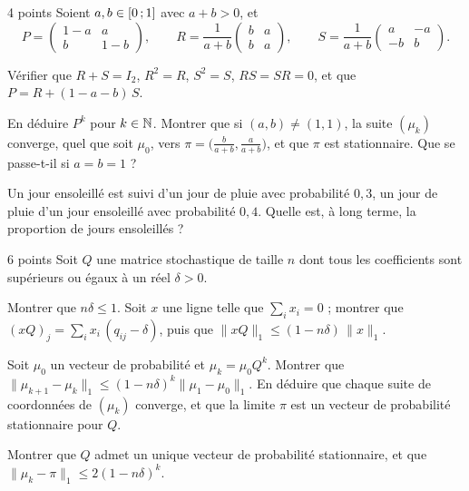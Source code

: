 \begin{exoEval}{4 points}{}
Soient $a,b\in\mathopen{[}0\,{;}\,1\mathclose{]}$ avec $a+b>0$, et
\[P=\begin{pmatrix}1-a&a\\b&1-b\end{pmatrix},\qquad
  R=\frac{1}{a+b}\begin{pmatrix}b&a\\b&a\end{pmatrix},\qquad
  S=\frac{1}{a+b}\begin{pmatrix}a&-a\\-b&b\end{pmatrix}.\]
\begin{questions}[start=3]
  \item Vérifier que $R+S=I_2$, $R^{2}=R$, $S^{2}=S$, $RS=SR=0$, et que
    $P=R+(1-a-b)\,S$.
  \item En déduire $P^{k}$ pour $k\in\mathbb{N}$. Montrer que si
    $(a,b)\neq(1,1)$, la suite $(\mu_k)$ converge, quel que soit $\mu_0$,
    vers $\pi=\bigl(\frac{b}{a+b},\frac{a}{a+b}\bigr)$, et que $\pi$ est
    stationnaire. Que se passe-t-il si $a=b=1$ ?
  \item Un jour ensoleillé est suivi d'un jour de pluie avec probabilité
    $0{,}3$, un jour de pluie d'un jour ensoleillé avec probabilité $0{,}4$.
    Quelle est, à long terme, la proportion de jours ensoleillés ?
\end{questions}
\end{exoEval}

\begin{exoEval}{6 points}{}
Soit $Q$ une matrice stochastique de taille $n$ dont tous les coefficients
sont supérieurs ou égaux à un réel $\delta>0$.
\begin{questions}[start=6]
  \item Montrer que $n\delta\leqslant1$. Soit $x$ une ligne telle que
    $\sum_ix_i=0$ ; montrer que $(xQ)_j=\sum_ix_i\,(q_{ij}-\delta)$, puis que
    $\lVert xQ\rVert_1\leqslant(1-n\delta)\,\lVert x\rVert_1$.
  \item Soit $\mu_0$ un vecteur de probabilité et $\mu_k=\mu_0Q^{k}$.
    Montrer que
    $\lVert\mu_{k+1}-\mu_k\rVert_1\leqslant(1-n\delta)^{k}\lVert\mu_1-\mu_0\rVert_1$.
    En déduire que chaque suite de coordonnées de $(\mu_k)$ converge, et que
    la limite $\pi$ est un vecteur de probabilité stationnaire pour $Q$.
  \item Montrer que $Q$ admet un unique vecteur de probabilité stationnaire,
    et que $\lVert\mu_k-\pi\rVert_1\leqslant2(1-n\delta)^{k}$.
\end{questions}
\end{exoEval}

